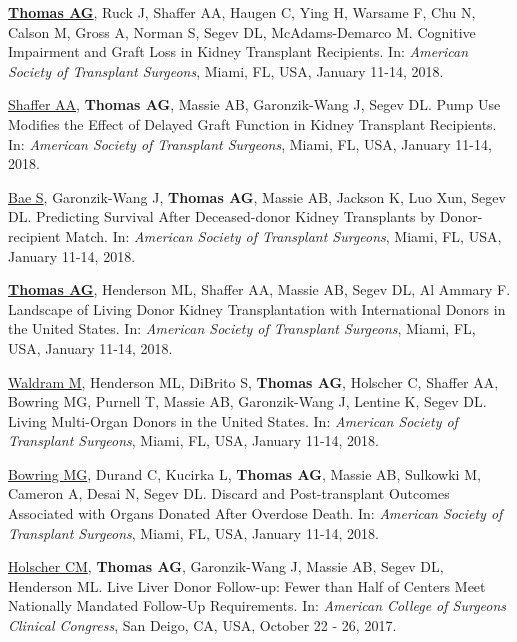 \documentclass[10pt]{article}
\makeatletter
\newlength{\bibhang}
\newlength{\bibsep}
 {\@listi \global\bibsep\itemsep \global\advance\bibsep by\parsep}
\newenvironment{bibenum*}
  {\renewcommand\labelenumi{[\theenumi]}%
   \etaremune[
     topsep=0pt,
     itemsep=\bibsep,
     parsep=0pt,partopsep=0pt,
     itemindent=-\bibhang,
     leftmargin={\bibhang+\widthof{[999]}}]}
  {\endetaremune}
\makeatother
\begin{document}
\begin{bibenum*}
\item \underline{\textbf{Thomas AG}}, Ruck J, Shaffer AA, Haugen C,
  Ying H, Warsame F, Chu N, Calson M, Gross A, Norman S, Segev DL,
  McAdams-Demarco M. Cognitive Impairment and Graft Loss in
  Kidney Transplant Recipients.
  In: \emph{American Society of Transplant Surgeons},
  Miami, FL, USA, January 11-14, 2018.

\item \underline{Shaffer AA}, \textbf{Thomas AG}, Massie AB,
  Garonzik-Wang J, Segev DL. Pump Use Modifies the Effect of Delayed
  Graft Function in Kidney Transplant Recipients.
  In: \emph{American Society of Transplant Surgeons},
  Miami, FL, USA, January 11-14, 2018.

\item \underline{Bae S}, Garonzik-Wang J, \textbf{Thomas AG}, Massie AB,
  Jackson K, Luo Xun, Segev DL.
  Predicting Survival After Deceased-donor Kidney Transplants by
  Donor-recipient Match.
  In: \emph{American Society of Transplant Surgeons},
  Miami, FL, USA, January 11-14, 2018.

\item \underline{\textbf{Thomas AG}}, Henderson ML, Shaffer AA,
  Massie AB, Segev DL, Al Ammary F. Landscape of Living Donor Kidney
  Transplantation with International Donors in the United States.
  In: \emph{American Society of Transplant Surgeons},
  Miami, FL, USA, January 11-14, 2018.

\item \underline{Waldram M}, Henderson ML, DiBrito S, \textbf{Thomas AG},
  Holscher C, Shaffer AA, Bowring MG, Purnell T, Massie AB,
  Garonzik-Wang J, Lentine K, Segev DL. Living Multi-Organ Donors in the
  United States.
  In: \emph{American Society of Transplant Surgeons},
  Miami, FL, USA, January 11-14, 2018.

\item \underline{Bowring MG}, Durand C, Kucirka L, \textbf{Thomas AG},
  Massie AB, Sulkowki M, Cameron A, Desai N, Segev DL.
  Discard and Post-transplant Outcomes Associated with Organs
  Donated After Overdose Death.
  In: \emph{American Society of Transplant Surgeons},
  Miami, FL, USA, January 11-14, 2018.

\item \underline{Holscher CM}, \textbf{Thomas AG}, Garonzik-Wang J,
  Massie AB, Segev DL, Henderson ML. Live Liver Donor Follow-up: Fewer
  than Half of Centers Meet Nationally Mandated Follow-Up Requirements.
  In: \emph{American College of Surgeons Clinical Congress},
  San Deigo, CA, USA, October 22 - 26, 2017.


\end{bibenum*}
\end{document}
